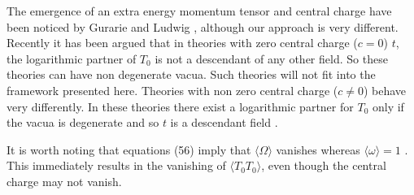 \documentclass[a4paper,11pt]{article}
\begin{document}
The emergence of an extra energy momentum tensor and central
charge have been noticed by Gurarie and Ludwig \cite{lud},
although our approach is very different. Recently it has been
argued \cite{nic} that in theories with zero central charge
($c=0$) $t$, the logarithmic partner of $T_{0}$ is not a
descendant of any other field. So these theories can have non
degenerate vacua. Such theories will not fit into the framework
presented here. Theories with non zero central charge ($c\ne0$)
behave very differently. In these theories there exist a
logarithmic partner for $T_{0}$ only if the vacua is degenerate
and so $t$ is a descendant field \cite{nic}.

It is worth noting that equations (56) imply that $\langle \Omega
\rangle$ vanishes whereas $\langle\omega\rangle = 1$ . This
immediately results in the vanishing of $\langle T_{0}T_{0}
\rangle $, even though the central charge may not vanish.
\end{document}
